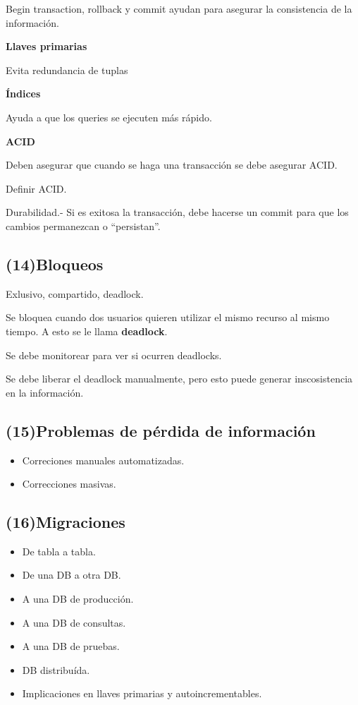 \documentclass{article}
\begin{document}
Begin transaction, rollback y commit ayudan para asegurar la consistencia de la
información.
\vspace{1em}

\textbf{Llaves primarias}

Evita redundancia de tuplas
\vspace{1em}

\textbf{Índices}

Ayuda a que los queries se ejecuten más rápido.
\vspace{1em}

\textbf{ACID}

Deben asegurar que cuando se haga una transacción se debe asegurar ACID.

Definir ACID.

Durabilidad.- Si es exitosa la transacción, debe hacerse un commit para que los
cambios permanezcan o ``persistan''.

\subsection{(14)Bloqueos}

Exlusivo, compartido, deadlock.

Se bloquea cuando dos usuarios quieren utilizar el mismo recurso al mismo
tiempo. A esto se le llama \textbf{deadlock}.

Se debe monitorear para ver si ocurren deadlocks.

Se debe liberar el deadlock manualmente, pero esto puede generar inscosistencia
en la información.

\subsection{(15)Problemas de pérdida de información}

\begin{itemize}
	\item
	Correciones manuales automatizadas.
	\item
	Correcciones masivas.
\end{itemize}

\subsection{(16)Migraciones}

\begin{itemize}
	\item
	De tabla a tabla.
	\item
	De una DB a otra DB.
	\item
	A una DB de producción.
	\item
	A una DB de consultas.
	\item
	A una DB de pruebas.
	\item
	DB distribuída.
	\item
	Implicaciones en llaves primarias y autoincrementables.
\end{itemize}
\vspace{1em}
\end{document}
